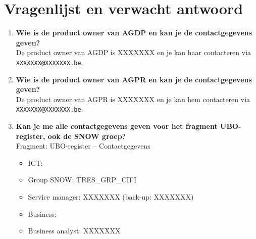 \section{Vragenlijst en verwacht antwoord}
\label{vragenlijst}

\begin{enumerate}
    \item \textbf{Wie is de product owner van AGDP en kan je de contactgegevens geven?} \\
    De product owner van AGDP is XXXXXXX en je kan haar contacteren via\\
    \texttt{XXXXXXX@XXXXXXX.be}.
    
    \item \textbf{Wie is de product owner van AGPR en kan je de contactgegevens geven?} \\
    De product owner van AGPR is XXXXXXX en je kan hem contacteren via\\
    \texttt{XXXXXXX@XXXXXXX.be}.
    
    \item \textbf{Kan je me alle contactgegevens geven voor het fragment UBO-register, ook de SNOW groep?} \\
    Fragment: UBO-register – Contactgegevens
    \begin{itemize}
        \item ICT:
        \item Group SNOW: TRES\_GRP\_CIFI
        \item Service manager: XXXXXXX (back-up: XXXXXXX)
        \item Business:
        \item Business analyst: XXXXXXX
    \end{itemize}
    

\end{enumerate}
